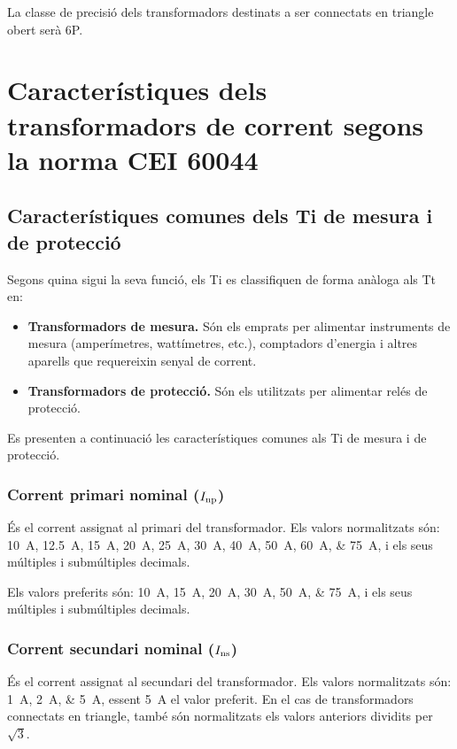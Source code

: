 La classe de precisió dels transformadors destinats a ser connectats en triangle obert serà 6P.

\section{Característiques dels transformadors de corrent segons la norma  CEI 60044}

\subsection{Característiques comunes dels Ti de mesura i de protecció}

Segons quina sigui la seva funció, els Ti es classifiquen de forma
anàloga als Tt en:
\begin{itemize}
	\item \textbf{Transformadors de mesura.} Són els emprats per alimentar
	instruments de mesura (amperímetres, wattímetres, etc.),
	comptadors d'energia i altres aparells que requereixin senyal de corrent.
	\item \textbf{Transformadors de protecció.} Són els utilitzats per
	alimentar relés de protecció.
\end{itemize}			

Es presenten a continuació les característiques comunes als Ti de
mesura i de protecció.


\subsubsection{Corrent primari nominal ($I_\mathrm{np}$)}

 És el corrent assignat al
primari del transformador. Els valors normalitzats
són: \qtylist{10; 12,5; 15; 20; 25;30; 40; 50; 60;75}{A}, i els
seus múltiples i submúltiples decimals.

Els valors preferits són: \qtylist{10; 15; 20; 30; 50;75}{A}, i els
seus múltiples i submúltiples decimals.


\subsubsection{Corrent secundari nominal ($I_\mathrm{ns}$)}

 És el corrent assignat al
secundari del transformador. Els valors normalitzats
són: \qtylist{1;2;5}{A}, essent \qty{5}{A} el valor preferit. En el cas de transformadors connectats en triangle, també són normalitzats els valors anteriors dividits per $ \sqrt{3}$.

